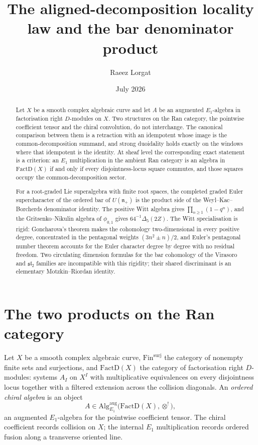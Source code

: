 \documentclass[11pt,reqno]{amsart}
\title[Locality and bar denominators]
{The aligned-decomposition locality law and the bar denominator product}
\author{Raeez Lorgat}
\date{July 2026}
\theoremstyle{definition}
\theoremstyle{remark}
\providecommand{\FactD}{\mathrm{FactD}}
\providecommand{\Alg}{\mathrm{Alg}}
\providecommand{\Fin}{\mathrm{Fin}}
\begin{document}
\begin{abstract}
Let $X$ be a smooth complex algebraic curve and let $A$ be an augmented
$E_1$-algebra in factorisation right $D$-modules on $X$. Two structures
on the Ran category, the pointwise coefficient tensor and the chiral
convolution, do not interchange. The canonical comparison between them
is a retraction with an idempotent whose image is the
common-decomposition summand, and strong duoidality holds exactly on the
windows where that idempotent is the identity. At sheaf level the
corresponding exact statement is a criterion: an $E_1$ multiplication in
the ambient Ran category is an algebra in $\FactD(X)$ if and only if
every disjointness-locus square commutes, and those squares occupy the
common-decomposition sector.

For a root-graded Lie superalgebra with finite root spaces, the completed
graded Euler supercharacter of the ordered bar of $U(\mathfrak n_+)$ is
the product side of the Weyl--Kac--Borcherds denominator identity. The
positive Witt algebra gives $\prod_{n\ge1}(1-q^n)$, and the
Gritsenko--Nikulin algebra of $\phi_{0,1}$ gives
$64^{-1}\Delta_5(2Z)$. The Witt specialisation is rigid: Goncharova's
theorem makes the cohomology two-dimensional in every positive degree,
concentrated in the pentagonal weights $(3n^2\pm n)/2$, and Euler's
pentagonal number theorem accounts for the Euler character degree by
degree with no residual freedom. Two circulating dimension formulas for
the bar cohomology of the Virasoro and $\mathfrak{sl}_2$ families are
incompatible with this rigidity; their shared discriminant is an
elementary Motzkin--Riordan identity.
\end{abstract}

\maketitle

\section{The two products on the Ran category}

Let $X$ be a smooth complex algebraic curve, $\Fin^{\mathrm{surj}}$ the
category of nonempty finite sets and surjections, and $\FactD(X)$ the
category of factorisation right $D$-modules: systems $A_I$ on $X^I$ with
multiplicative equivalences on every disjointness locus together with a
filtered extension across the collision diagonals. An
\emph{ordered chiral algebra} is an object
\[
  A \in \Alg^{\mathrm{aug}}_{E_1}\bigl(\FactD(X), \otimes^!\bigr),
\]
an augmented $E_1$-algebra for the pointwise coefficient tensor. The
chiral coefficient records collision on $X$; the internal $E_1$
multiplication records ordered fusion along a transverse oriented line.
\end{document}
